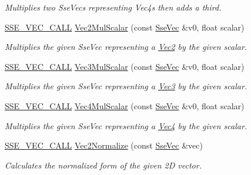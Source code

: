 \begin{DoxyCompactItemize}
\begin{DoxyCompactList}\small\item\em Multiplies two Sse\+Vecs representing Vec4s then adds a third. \end{DoxyCompactList}\item 
\hyperlink{ssevec__math__defs_8h_a97454f977a5281455cecacce1e8ba670}{S\+S\+E\+\_\+\+V\+E\+C\+\_\+\+C\+A\+L\+L} \hyperlink{group___s_i_m_d_vec_math_ga3498fd49b8075dc7bea8512216819822}{Vec2\+Mul\+Scalar} (const \hyperlink{namespacegofxmath_a634570ddcd2496053ee966227080e02f}{Sse\+Vec} \&v0, float scalar)
\begin{DoxyCompactList}\small\item\em Multiplies the given Sse\+Vec representing a \hyperlink{classgofxmath_1_1_vec2}{Vec2} by the given scalar. \end{DoxyCompactList}\item 
\hyperlink{ssevec__math__defs_8h_a97454f977a5281455cecacce1e8ba670}{S\+S\+E\+\_\+\+V\+E\+C\+\_\+\+C\+A\+L\+L} \hyperlink{group___s_i_m_d_vec_math_ga8629aabc4a7f360497641e3e9179dc4b}{Vec3\+Mul\+Scalar} (const \hyperlink{namespacegofxmath_a634570ddcd2496053ee966227080e02f}{Sse\+Vec} \&v0, float scalar)
\begin{DoxyCompactList}\small\item\em Multiplies the given Sse\+Vec representing a \hyperlink{classgofxmath_1_1_vec3}{Vec3} by the given scalar. \end{DoxyCompactList}\item 
\hyperlink{ssevec__math__defs_8h_a97454f977a5281455cecacce1e8ba670}{S\+S\+E\+\_\+\+V\+E\+C\+\_\+\+C\+A\+L\+L} \hyperlink{group___s_i_m_d_vec_math_gac0c5fe54879497395203b4bf7e31586b}{Vec4\+Mul\+Scalar} (const \hyperlink{namespacegofxmath_a634570ddcd2496053ee966227080e02f}{Sse\+Vec} \&v0, float scalar)
\begin{DoxyCompactList}\small\item\em Multiplies the given Sse\+Vec representing a \hyperlink{classgofxmath_1_1_vec4}{Vec4} by the given scalar. \end{DoxyCompactList}\item 
\hyperlink{ssevec__math__defs_8h_a97454f977a5281455cecacce1e8ba670}{S\+S\+E\+\_\+\+V\+E\+C\+\_\+\+C\+A\+L\+L} \hyperlink{group___s_i_m_d_vec_math_ga2924184aeecf58733cf8cd36e025b0a6}{Vec2\+Normalize} (const \hyperlink{namespacegofxmath_a634570ddcd2496053ee966227080e02f}{Sse\+Vec} \&vec)
\begin{DoxyCompactList}\small\item\em Calculates the normalized form of the given 2\+D vector. \end{DoxyCompactList}\item 

\end{DoxyCompactItemize}
